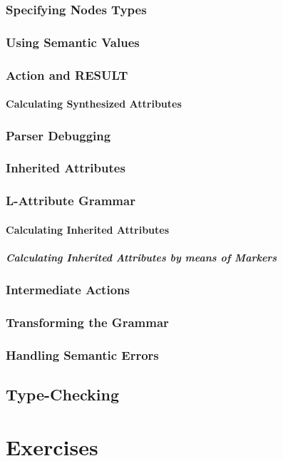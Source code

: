 \documentclass[pdfa,cucitura]{toptesi}
\begin{document}
\section{Specifying Nodes Types}

\section{Using Semantic Values}

\section{Action and RESULT}

\subsection{Calculating Synthesized Attributes}

\section{Parser Debugging}

\section{Inherited Attributes}

\section{L-Attribute Grammar}

\subsection{Calculating Inherited Attributes}

\subsubsection{Calculating Inherited Attributes by means of Markers}

\section{Intermediate Actions}

\section{Transforming the Grammar}

\section{Handling Semantic Errors}




\chapter{Type-Checking}

\part{Exercises}
\end{document}
